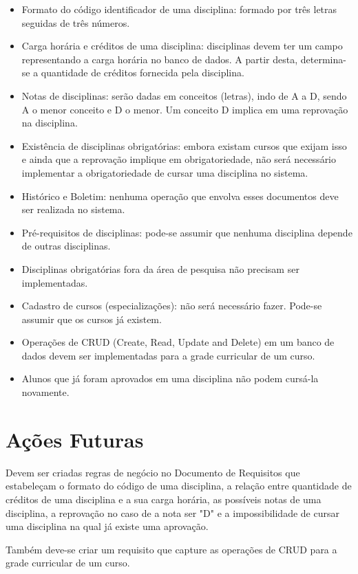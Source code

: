 \documentclass{article}
\begin{document}
\begin{itemize}

	\item Formato do código identificador de uma disciplina: formado por três letras seguidas de três números.
    
    \item Carga horária e créditos de uma disciplina: disciplinas devem ter um campo representando a carga horária no banco de dados. A partir desta, determina-se a quantidade de créditos fornecida pela disciplina.
    
    \item Notas de disciplinas: serão dadas em conceitos (letras), indo de A a D, sendo A o menor conceito e D o menor. Um conceito D implica em uma reprovação na disciplina.
    
    \item Existência de disciplinas obrigatórias: embora existam cursos que exijam isso e ainda que a reprovação implique em obrigatoriedade, não será necessário implementar a obrigatoriedade de cursar uma disciplina no sistema.
    
    \item Histórico e Boletim: nenhuma operação que envolva esses documentos deve ser realizada no sistema.
    
    \item Pré-requisitos de disciplinas: pode-se assumir que nenhuma disciplina depende de outras disciplinas.
    
    \item Disciplinas obrigatórias fora da área de pesquisa não precisam ser implementadas.
    
    \item Cadastro de cursos (especializações): não será necessário fazer. Pode-se assumir que os cursos já existem.
    
    \item Operações de CRUD (Create, Read, Update and Delete) em um banco de dados devem ser implementadas para a grade curricular de um curso.
    
    \item Alunos que já foram aprovados em uma disciplina não podem cursá-la novamente.

\end{itemize}



\section{Ações Futuras}

Devem ser criadas regras de negócio no Documento de Requisitos que estabeleçam o formato do código de uma disciplina, a relação entre quantidade de créditos de uma disciplina e a sua carga horária, as possíveis notas de uma disciplina, a reprovação no caso de a nota ser "D" e a impossibilidade de cursar uma disciplina na qual já existe uma aprovação. 

Também deve-se criar um requisito que capture as operações de CRUD para a grade curricular de um curso.
\end{document}
